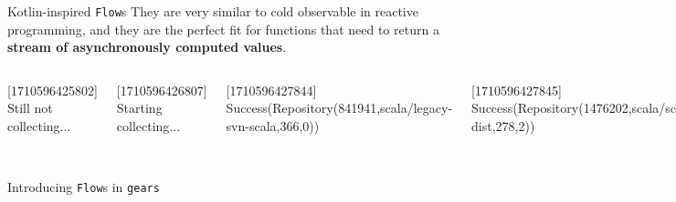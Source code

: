 \documentclass[aspectratio=169,xcolor=dvipsnames]{beamer}
\begin{document}
\begin{frame}
    \begin{block}{Kotlin-inspired \texttt{Flow}s}
        They are very similar to cold observable in reactive programming, and they are the perfect fit for functions that need to return a \textbf{stream of asynchronously computed values}.
    \end{block}
    
\end{frame}


\begin{frame}
    \begin{columns}
        

        

        \footnotesize
        [1710596425802] Still not collecting...

        [1710596426807] Starting collecting...

        [1710596427844] Success(Repository(841941,scala/legacy-svn-scala,366,0))

        [1710596427845] Success(Repository(1476202,scala/scala-dist,278,2))

        ...

        [1710596428750] Done!

        \vspace*{0.4cm}

        [1710596865118] Still not collecting...

        [1710596866120] Starting collecting...

        [1710596866383] Failure(java.lang.Exception:\{"message":"Not Found",...\})

        [1710596866383] Done!

        \vspace*{1.2cm}
    \end{columns}
\end{frame}


\begin{frame}{Introducing \texttt{Flow}s in \texttt{gears}}
    
\end{frame}
\end{document}
